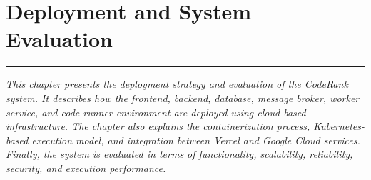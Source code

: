 \chapter{Deployment and System Evaluation}
\noindent
\rule{\textwidth}{0.4pt}

\begin{center}
\begin{minipage}{0.8\textwidth}
\textit{This chapter presents the deployment strategy and evaluation of the CodeRank system. It describes how the frontend, backend, database, message broker, worker service, and code runner environment are deployed using cloud-based infrastructure. The chapter also explains the containerization process, Kubernetes-based execution model, and integration between Vercel and Google Cloud services. Finally, the system is evaluated in terms of functionality, scalability, reliability, security, and execution performance.}
\end{minipage}
\end{center}



